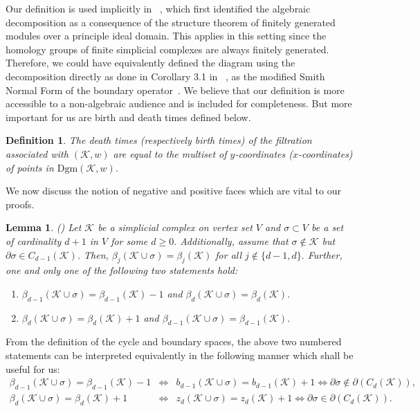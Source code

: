 \documentclass[12pt]{amsart}
\newtheorem{lemma}[theorem]{Lemma}
\newtheorem{definition}[theorem]{Definition}
\numberwithin{equation}{section}
\numberwithin{theorem}{section}
\newcommand{\Dgm}{\mathrm{Dgm}}
\newcommand{\1}{\mathbf{1}}
\def\K{\mathcal{K}}
\begin{document}
Our definition is used implicitly in ~\cite{zomorodian2005computing}, which first identified the algebraic decomposition as a consequence of the structure theorem of finitely generated modules over a principle ideal domain. This applies in this setting since the homology groups of finite simplicial complexes are always finitely generated.  Therefore, we could have equivalently defined the diagram using the decomposition directly as done in Corollary 3.1 in ~\cite{zomorodian2005computing}, as the modified Smith Normal Form of the boundary operator~\cite{skraba2013persistence}. We believe that our definition is more accessible to a non-algebraic audience and is included for completeness. But more important for us are birth and death times defined below.
%
\begin{definition}
\label{defn:death_times}
The \emph{death times} (respectively \emph{birth times}) of the filtration associated with $(\K, w)$ are equal to the multiset of $y$-coordinates ($x$-coordinates) of points in $\Dgm(\K, w)$.
\end{definition}
%	
We now discuss the notion of negative and positive faces which are vital to our proofs. 
%
\begin{lemma}(\cite[Section 3]{delfinado1993incremental})
\label{lem:delfinado}
Let $\K$ be a simplicial complex on vertex set $V$ and $\sigma \subset V$ be a set of cardinality $d + 1$ in $V$ for some $d \geq 0.$ Additionally, assume that $\sigma \notin \K$ but $\partial \sigma \in C_{d-1}(\K)$. Then, $\beta_j(\K \cup \sigma) = \beta_j(\K)$ for all $j \notin \{d - 1, d\}.$ Further, one and only one of the following two statements hold:
%
\begin{enumerate}
\item $\beta_{d-1}(\K \cup \sigma) = \beta_{d-1}(\K) -1$ and $\beta_{d}(\K \cup \sigma) = \beta_d(\K).$
\item $\beta_d(\K \cup \sigma) = \beta_d(\K) + 1$ and $\beta_{d - 1}(\K \cup \sigma) = \beta_{d - 1}(\K).$
\end{enumerate}
%
\end{lemma}

From the definition of the cycle and boundary spaces, the above two numbered statements can be interpreted equivalently in the following manner which shall be useful for us:
%
\begin{eqnarray}
\beta_{d-1}(\K \cup \sigma) = \beta_{d-1}(\K) -1 & \Leftrightarrow & b_{d - 1}(\K \cup \sigma) = b_{d - 1}(\K) + 1 \Leftrightarrow \partial \sigma \notin \partial (C_d(\K)), \label{eqn:negative_image} \\
\beta_d(\K \cup \sigma) = \beta_d(\K) + 1 & \Leftrightarrow & z_d(\K \cup \sigma) = z_d(\K) + 1 \Leftrightarrow \partial \sigma \in \partial (C_d(\K)).
\label{eqn:positive_image}
\end{eqnarray}
%	
\end{document}
